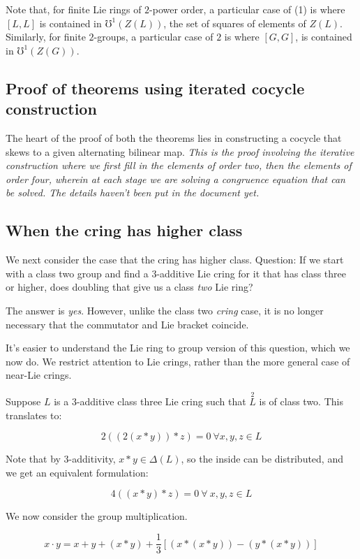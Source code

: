 \documentclass[10pt]{amsart}
\begin{document}
Note that, for finite Lie rings of $2$-power order, a particular case
of (1) is where $[L,L]$ is contained in $\mho^1(Z(L))$, the set of
squares of elements of $Z(L)$. Similarly, for finite $2$-groups, a
particular case of $2$ is where $[G,G]$, is contained in $\mho^1(Z(G))$.

\subsection{Proof of theorems using iterated cocycle construction}

The heart of the proof of both the theorems lies in constructing a
cocycle that skews to a given alternating bilinear map. {\em This is
the proof involving the iterative construction where we first fill in
the elements of order two, then the elements of order four, wherein at
each stage we are solving a congruence equation that can be
solved. The details haven't been put in the document yet.}

\subsection{When the cring has higher class}

We next consider the case that the cring has higher class. Question:
If we start with a class two group and find a $3$-additive Lie cring
for it that has class three or higher, does doubling that give us a
class {\em two} Lie ring?

The answer is {\em yes}. However, unlike the class two {\em cring}
case, it is no longer necessary that the commutator and Lie bracket
coincide.

It's easier to understand the Lie ring to group version of this
question, which we now do. We restrict attention to Lie crings, rather
than the more general case of near-Lie crings.

Suppose $L$ is a $3$-additive class three Lie cring such that
$\stackrel{2}{L}$ is of class two. This translates to:

$$2((2(x * y)) * z) = 0 \ \forall x,y,z \in L$$

Note that by $3$-additivity, $x * y \in \Delta(L)$, so the inside can
be distributed, and we get an equivalent formulation:

$$4((x * y) * z) = 0 \ \forall \ x,y,z \in L$$

We now consider the group multiplication.

$$x \cdot y = x + y + (x * y) + \frac{1}{3}[(x * (x * y)) - (y * (x * y))]$$
\end{document}
